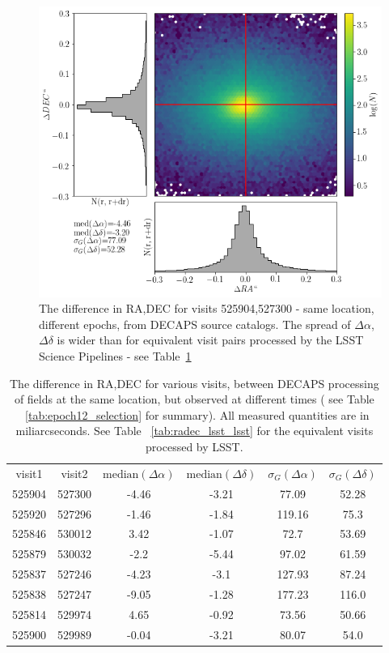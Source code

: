 \documentclass[DM,lsstdraft,toc,usenatbib]{lsstdoc}
\begin{document}
\begin{figure}
\begin{centering}
\includegraphics[width=0.8\columnwidth]{figs/24_decaps525904-527300_RA_DEC_offset.png}
\caption{The difference in RA,DEC for visits 525904,527300 - same location, different epochs, from DECAPS source catalogs. The spread of  $\Delta \alpha$, $\Delta \delta$ is wider than for equivalent visit pairs processed by the LSST Science Pipelines - see Table~\ref{tab:radec_decaps_decaps}}
\label{fig:ra_dec_decaps_decaps}
\end{centering}
\end{figure} 



\begin{table}
\centering
\caption{The difference in RA,DEC for various visits, between DECAPS processing of fields at the same location, but observed at different times ( see Table ~\ref{tab:epoch12_selection} for summary). All  measured quantities are in miliarcseconds. See Table ~\ref{tab:radec_lsst_lsst} for the equivalent visits processed by LSST. }
\label{tab:radec_decaps_decaps}
\begin{tabular}{cccccc}
visit1 & visit2 & $\mathrm{median}(\Delta\alpha)$ & $\mathrm{median}(\Delta\delta)$ & $\sigma_{G}(\Delta\alpha)$ & $\sigma_{G}(\Delta\delta)$ \\
525904 & 527300 & -4.46 & -3.21 & 77.09 & 52.28 \\
525920 & 527296 & -1.46 & -1.84 & 119.16 & 75.3 \\
525846 & 530012 & 3.42 & -1.07 & 72.7 & 53.69 \\
525879 & 530032 & -2.2 & -5.44 & 97.02 & 61.59 \\
525837 & 527246 & -4.23 & -3.1 & 127.93 & 87.24 \\
525838 & 527247 & -9.05 & -1.28 & 177.23 & 116.0 \\
525814 & 529974 & 4.65 & -0.92 & 73.56 & 50.66 \\
525900 & 529989 & -0.04 & -3.21 & 80.07 & 54.0 \\
\end{tabular}
\end{table}
\end{document}

